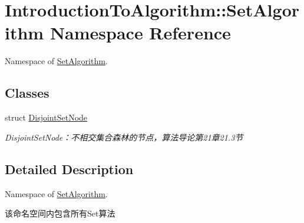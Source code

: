 \hypertarget{namespace_introduction_to_algorithm_1_1_set_algorithm}{}\section{Introduction\+To\+Algorithm\+:\+:Set\+Algorithm Namespace Reference}
\label{namespace_introduction_to_algorithm_1_1_set_algorithm}


Namespace of \hyperlink{namespace_introduction_to_algorithm_1_1_set_algorithm}{Set\+Algorithm}.  


\subsection*{Classes}
\begin{DoxyCompactItemize}
\item 
struct \hyperlink{struct_introduction_to_algorithm_1_1_set_algorithm_1_1_disjoint_set_node}{Disjoint\+Set\+Node}
\begin{DoxyCompactList}\small\item\em Disjoint\+Set\+Node：不相交集合森林的节点，算法导论第21章21.3节 \end{DoxyCompactList}\end{DoxyCompactItemize}


\subsection{Detailed Description}
Namespace of \hyperlink{namespace_introduction_to_algorithm_1_1_set_algorithm}{Set\+Algorithm}. 

该命名空间内包含所有{\ttfamily Set}算法 